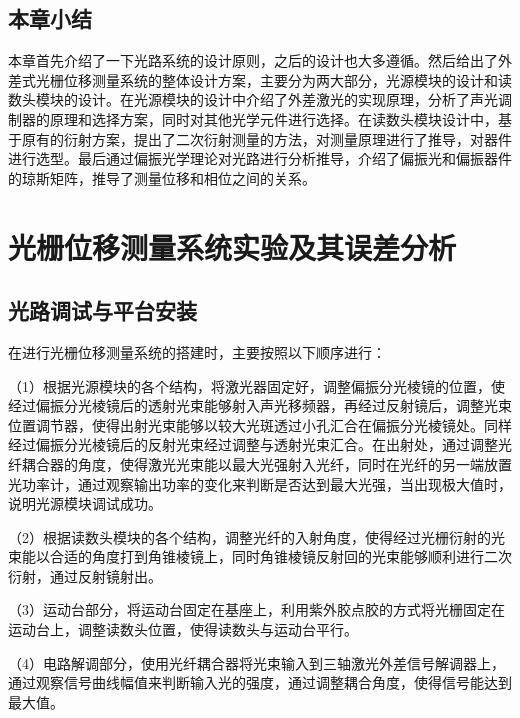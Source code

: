 \documentclass[type=master,oneside]{fduthesis}
\begin{document}
\section{本章小结}
本章首先介绍了一下光路系统的设计原则，之后的设计也大多遵循。然后给出了外差式光栅位移测量系统的整体设计方案，主要分为两大部分，光源模块的设计和读数头模块的设计。在光源模块的设计中介绍了外差激光的实现原理，分析了声光调制器的原理和选择方案，同时对其他光学元件进行选择。在读数头模块设计中，基于原有的衍射方案，提出了二次衍射测量的方法，对测量原理进行了推导，对器件进行选型。最后通过偏振光学理论对光路进行分析推导，介绍了偏振光和偏振器件的琼斯矩阵，推导了测量位移和相位之间的关系。


\chapter{光栅位移测量系统实验及其误差分析}
\section{光路调试与平台安装}
在进行光栅位移测量系统的搭建时，主要按照以下顺序进行：

（1）根据光源模块的各个结构，将激光器固定好，调整偏振分光棱镜的位置，使经过偏振分光棱镜后的透射光束能够射入声光移频器，再经过反射镜后，调整光束位置调节器，使得出射光束能够以较大光斑透过小孔汇合在偏振分光棱镜处。同样经过偏振分光棱镜后的反射光束经过调整与透射光束汇合。在出射处，通过调整光纤耦合器的角度，使得激光光束能以最大光强射入光纤，同时在光纤的另一端放置光功率计，通过观察输出功率的变化来判断是否达到最大光强，当出现极大值时，说明光源模块调试成功。

（2）根据读数头模块的各个结构，调整光纤的入射角度，使得经过光栅衍射的光束能以合适的角度打到角锥棱镜上，同时角锥棱镜反射回的光束能够顺利进行二次衍射，通过反射镜射出。

（3）运动台部分，将运动台固定在基座上，利用紫外胶点胶的方式将光栅固定在运动台上，调整读数头位置，使得读数头与运动台平行。

（4）电路解调部分，使用光纤耦合器将光束输入到三轴激光外差信号解调器上，通过观察信号曲线幅值来判断输入光的强度，通过调整耦合角度，使得信号能达到最大值。
\end{document}
